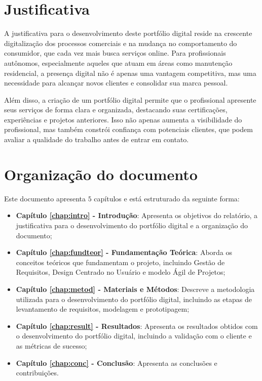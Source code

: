 \section{Justificativa}
\label{sec:justi}

A justificativa para o desenvolvimento deste portfólio digital reside na crescente digitalização dos processos comerciais e na mudança no comportamento do consumidor, que cada vez mais busca serviços online. Para profissionais autônomos, especialmente aqueles que atuam em áreas como manutenção residencial, a presença digital não é apenas uma vantagem competitiva, mas uma necessidade para alcançar novos clientes e consolidar sua marca pessoal.

Além disso, a criação de um portfólio digital permite que o profissional apresente seus serviços de forma clara e organizada, destacando suas certificações, experiências e projetos anteriores. Isso não apenas aumenta a visibilidade do profissional, mas também constrói confiança com potenciais clientes, que podem avaliar a qualidade do trabalho antes de entrar em contato.

\section{Organização do documento}
\label{section:organizacao}

Este documento apresenta $5$ capítulos e está estruturado da seguinte forma:

\begin{itemize}

  \item \textbf{Capítulo  \ref{chap:intro} - Introdução}: Apresenta os objetivos do relatório, a justificativa para o desenvolvimento do portfólio digital e a organização do documento;
  \item \textbf{Capítulo  \ref{chap:fundteor} - Fundamentação Teórica}: Aborda os conceitos teóricos que fundamentam o projeto, incluindo Gestão de Requisitos, Design Centrado no Usuário e modelo Ágil de Projetos;
  \item \textbf{Capítulo  \ref{chap:metod} - Materiais e Métodos}: Descreve a metodologia utilizada para o desenvolvimento do portfólio digital, incluindo as etapas de levantamento de requisitos, modelagem e prototipagem;
  \item \textbf{Capítulo  \ref{chap:result} - Resultados}: Apresenta os resultados obtidos com o desenvolvimento do portfólio digital, incluindo a validação com o cliente e as métricas de sucesso;
  \item \textbf{Capítulo  \ref{chap:conc} - Conclusão}: Apresenta as conclusões e contribuições.

\end{itemize}